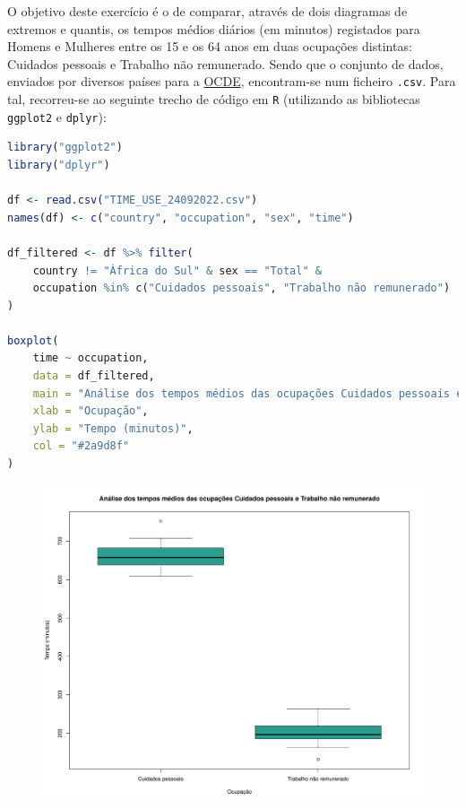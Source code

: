\documentclass[12pt,a4paper]{article}
\begin{document}
O objetivo deste exercício é o de comparar, através de dois diagramas de extremos e quantis, os tempos médios diários (em minutos)
registados para Homens e Mulheres entre os 15 e os 64 anos em duas ocupações distintas: Cuidados pessoais e Trabalho não remunerado.
Sendo que o conjunto de dados, enviados por diversos países para a \href{https://stats.oecd.org/Index.aspx?DataSetCode=TIME_USE}{OCDE}, encontram-se num ficheiro \texttt{.csv}.
Para tal, recorreu-se ao seguinte trecho de código em \texttt{R} (utilizando as bibliotecas \texttt{ggplot2} e \texttt{dplyr}):

\quad

\begin{lstlisting}[language=R]
library("ggplot2")
library("dplyr")

df <- read.csv("TIME_USE_24092022.csv")
names(df) <- c("country", "occupation", "sex", "time")

df_filtered <- df %>% filter(
    country != "África do Sul" & sex == "Total" &
    occupation %in% c("Cuidados pessoais", "Trabalho não remunerado")
)

boxplot(
    time ~ occupation,
    data = df_filtered,
    main = "Análise dos tempos médios das ocupações Cuidados pessoais e Trabalho não remunerado",
    xlab = "Ocupação",
    ylab = "Tempo (minutos)",
    col = "#2a9d8f"
)
\end{lstlisting}

\quad

\begin{figure}[h]
  \centering
  \includegraphics[scale = 0.6]{./ex02.png}
\end{figure}
\end{document}
